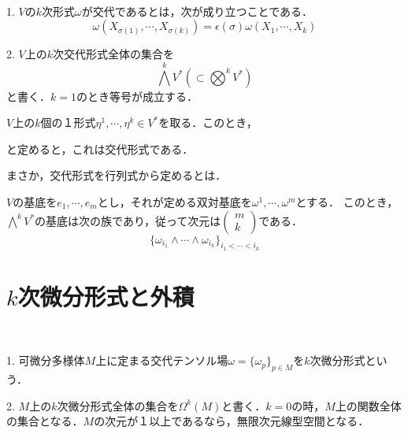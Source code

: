 \documentclass[uplatex, dvipdfmx]{jsreport}
\begin{document}
\begin{definition}　

    1. $V$の$k$次形式$\omega$が交代であるとは，次が成り立つことである．
    \[ \omega(X_{\sigma(1)},\cdots,X_{\sigma(k)})=\epsilon(\sigma)\omega(X_1,\cdots,X_k) \]

    2. $V$上の$k$次交代形式全体の集合を
    \[\bigwedge^kV^* \left( \subset\bigotimes^kV^* \right) \]
    と書く．$k=1$のとき等号が成立する．
\end{definition}
\begin{example}
    $V$上の$k$個の１形式$\eta^1,\cdots,\eta^k\in V^*$を取る．このとき，
    \begin{center}
    \end{center}
    と定めると，これは交代形式である．

    まさか，交代形式を行列式から定めるとは．
\end{example}

\begin{proposition}[basis]
    $V$の基底を$e_1,\cdots,e_m$とし，それが定める双対基底を$\omega^1,\cdots,\omega^m$とする．
    このとき，$\bigwedge^kV^*$の基底は次の族であり，従って次元は$\left(\begin{array}{c}m\\ k\end{array}\right)$である．
    \[ \{\omega_{i_1}\wedge\cdots\wedge\omega_{i_k}\}_{i_1<\cdots<i_k} \]
\end{proposition}

\section{$k$次微分形式と外積}

\begin{definition}　

    1. 可微分多様体$M$上に定まる交代テンソル場$\omega=\{\omega_p\}_{p\in M}$を$k$次微分形式という．

    2. $M$上の$k$次微分形式全体の集合を$\Omega^k(M)$と書く．$k=0$の時，$M$上の関数全体の集合となる．$M$の次元が１以上であるなら，無限次元線型空間となる．
\end{definition}
\end{document}
